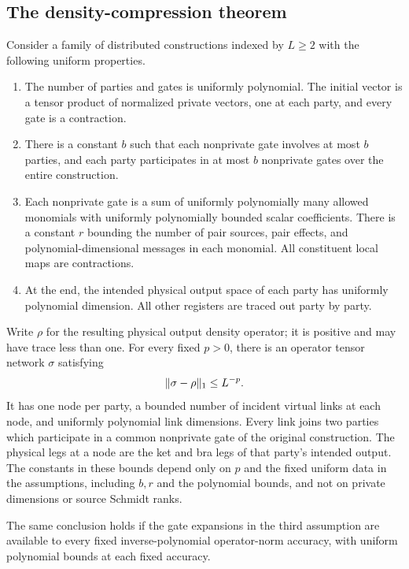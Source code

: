 \subsection{The density-compression theorem}

\begin{theorem}
\label{thm:compression}
Consider a family of distributed constructions indexed by $L\ge2$ with
the following uniform properties.
\begin{enumerate}
\item The number of parties and gates is uniformly polynomial.  The
initial vector is a tensor product of normalized private vectors, one
at each party, and every gate is a contraction.
\item There is a constant $b$ such that each nonprivate gate involves at
most $b$ parties, and each party participates in at most $b$ nonprivate
gates over the entire construction.
\item Each nonprivate gate is a sum of uniformly polynomially many
allowed monomials with uniformly polynomially bounded scalar
coefficients.  There is a constant $r$ bounding the number of pair
sources, pair effects, and polynomial-dimensional messages in each
monomial.  All constituent local maps are contractions.
\item At the end, the intended physical output space of each party has
uniformly polynomial dimension.  All other registers are traced out
party by party.
\end{enumerate}
Write $\rho$ for the resulting physical output density operator; it is
positive and may have trace less than one.  For every fixed $p>0$, there
is an operator tensor network $\sigma$ satisfying
\[
 \lVert \sigma-\rho\rVert_1\le L^{-p}.
\]
It has one node per party, a bounded number of incident virtual links at
each node, and uniformly polynomial link dimensions.  Every link joins
two parties which participate in a common nonprivate gate of the
original construction.  The physical legs at a node are the ket and bra
legs of that party's intended output.
The constants in these bounds depend only on $p$ and the fixed uniform
data in the assumptions, including $b,r$ and the polynomial bounds,
and not on private dimensions or source Schmidt ranks.

The same conclusion holds if the gate expansions in the third
assumption are available to every fixed inverse-polynomial
operator-norm accuracy, with uniform polynomial bounds at each fixed
accuracy.
\end{theorem}

